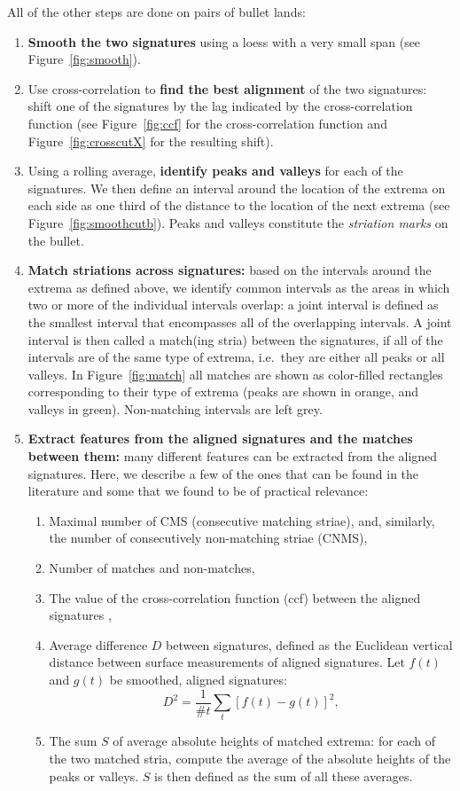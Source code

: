 \documentclass[aoas, preprint]{imsart}\usepackage[]{graphicx}\usepackage[]{color}
\begin{document}
All of the other steps are done on pairs of bullet lands:
\begin{enumerate}
\item {\bf Smooth the two signatures} using a loess with a very small span (see Figure~\ref{fig:smooth}). 
\item Use cross-correlation to {\bf find the best alignment} of the two signatures: shift one of the signatures by the lag indicated by the cross-correlation function (see Figure~\ref{fig:ccf} for the cross-correlation function and Figure~\ref{fig:crosscutX} for the resulting shift).
\item Using a rolling average, {\bf identify peaks and valleys} for each of the signatures. We then define an interval around the location of the extrema on each side as one third of the distance to the location of the next extrema (see Figure~\ref{fig:smoothcutb}). Peaks and valleys constitute the \emph{striation marks} on the bullet.
\item {\bf Match striations across signatures:} based on the intervals around the extrema as defined above, we identify common intervals as the areas in which two or more of the individual intervals overlap: a joint interval is defined as the smallest interval that encompasses all of the overlapping intervals. A joint interval is then called a match(ing stria) between the signatures, if all of the intervals are of the same type of extrema, i.e.\ they are either all peaks or all valleys. In Figure~\ref{fig:match} all matches are shown as color-filled rectangles corresponding to their type of extrema (peaks are shown in orange, and valleys in green). Non-matching intervals are left grey. 
\item {\bf Extract features from the aligned signatures and the matches between them:} many different features can be extracted from the aligned signatures. Here, we describe a few of the ones that can be found in the literature and some that we found to be of practical relevance:
\begin{enumerate}[label=(\roman*)]
\item Maximal number of CMS (consecutive matching striae), and, similarly, the number of consecutively non-matching striae (CNMS), 
\item Number of matches and non-matches,
\item The value of the cross-correlation function (ccf) between the aligned signatures \citep{vorburger:2011},
\item Average difference $D$ between signatures, defined as the Euclidean vertical distance between surface measurements of aligned signatures. Let $f(t)$ and $g(t)$ be smoothed, aligned signatures:
\[
D^2 = \frac{1}{\text{\#}t}\sum_t \left[f(t) - g(t)\right]^2,
\]
\item The sum $S$ of average absolute heights of matched extrema: for each of the two matched stria, compute the average of the absolute heights of the peaks or valleys. $S$ is then defined as the sum of all these averages. 
\end{enumerate}
\end{enumerate}
\end{document}
